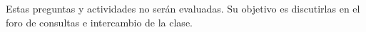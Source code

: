 Estas preguntas y actividades no serán evaluadas. Su objetivo es discutirlas en el foro de consultas e intercambio de la clase.



